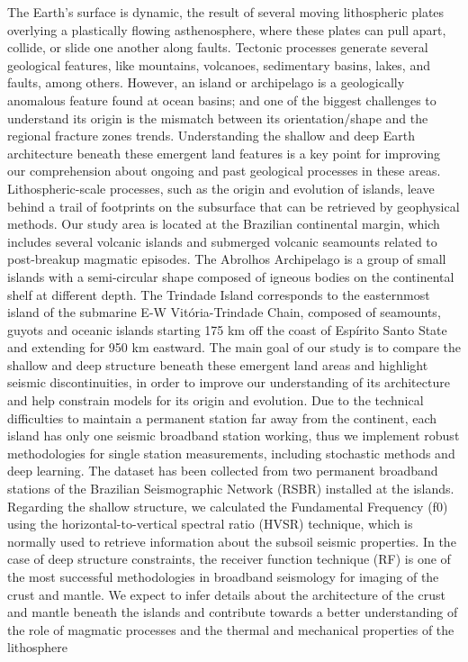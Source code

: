 \documentclass[10pt,a4paper,oneside]{book}
\begin{document}
The Earth's surface is dynamic, the result of several moving lithospheric plates overlying a plastically flowing asthenosphere, where these plates can pull apart, collide, or slide one another along faults. Tectonic processes generate several geological features, like mountains, volcanoes, sedimentary basins, lakes, and faults, among others. However, an island or archipelago is a geologically anomalous feature found at ocean basins; and one of the biggest challenges to understand its origin is the mismatch between its orientation/shape and the regional fracture zones trends. Understanding the shallow and deep Earth architecture beneath these emergent land features is a key point for improving our comprehension about ongoing and past geological processes in these areas. Lithospheric-scale processes, such as the origin and evolution of islands, leave behind a trail of footprints on the subsurface that can be retrieved by geophysical methods. Our study area is located at the Brazilian continental margin, which includes several volcanic islands and submerged volcanic seamounts related to post-breakup magmatic episodes. The Abrolhos Archipelago is a group of small islands with a semi-circular shape composed of igneous bodies on the continental shelf at different depth. The Trindade Island corresponds to the easternmost island of the submarine E-W Vitória-Trindade Chain, composed of seamounts, guyots and oceanic islands starting 175 km off the coast of Espírito Santo State and extending for 950 km eastward. The main goal of our study is to compare the shallow and deep structure beneath these emergent land areas and highlight seismic discontinuities, in order to improve our understanding of its architecture and help constrain models for its origin and evolution. Due to the technical difficulties to maintain a permanent station far away from the continent, each island has only one seismic broadband station working, thus we implement robust methodologies for single station measurements, including stochastic methods and deep learning. The dataset has been collected from two permanent broadband stations of the Brazilian Seismographic Network (RSBR) installed at the islands. Regarding the shallow structure, we calculated the Fundamental Frequency (f0) using the horizontal-to-vertical spectral ratio (HVSR) technique, which is normally used to retrieve information about the subsoil seismic properties. In the case of deep structure constraints, the receiver function technique (RF) is one of the most successful methodologies in broadband seismology for imaging of the crust and mantle. We expect to infer details about the architecture of the crust and mantle beneath the islands and contribute towards a better understanding of the role of magmatic processes and the thermal and mechanical properties of the lithosphere
\end{document}
